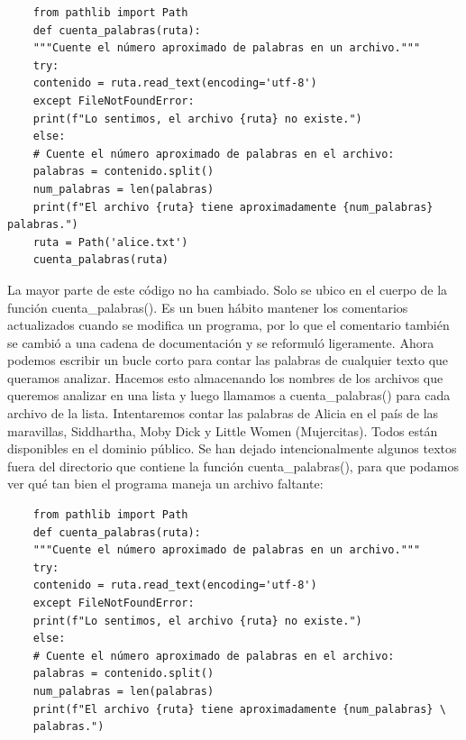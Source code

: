 \vspace{-0.2cm}
\hspace{-2.5cm}{\ttfamily \scriptsize palabras.py}\vspace{-0.84cm} 
\begin{lstlisting}
	from pathlib import Path
	def cuenta_palabras(ruta):
	"""Cuente el número aproximado de palabras en un archivo."""
	try:
	contenido = ruta.read_text(encoding='utf-8')
	except FileNotFoundError:
	print(f"Lo sentimos, el archivo {ruta} no existe.")
	else:
	# Cuente el número aproximado de palabras en el archivo:
	palabras = contenido.split()
	num_palabras = len(palabras)
	print(f"El archivo {ruta} tiene aproximadamente {num_palabras} palabras.")
	ruta = Path('alice.txt')
	cuenta_palabras(ruta)
\end{lstlisting}

La mayor parte de este código no ha cambiado. Solo se ubico en el cuerpo de la función {\ttfamily cuenta\_palabras()}. Es un buen hábito mantener los comentarios actualizados cuando se modifica un programa, por lo que el comentario también se cambió a una cadena de documentación y se reformuló ligeramente.
Ahora podemos escribir un bucle corto para contar las palabras de cualquier texto que queramos analizar. 
Hacemos esto almacenando los nombres de los archivos que queremos analizar en una lista y luego llamamos a {\ttfamily cuenta\_palabras()} para cada archivo de la lista. Intentaremos contar las palabras de Alicia en el país de las maravillas, Siddhartha, Moby Dick y Little Women (Mujercitas). Todos  están disponibles en el dominio público. Se han dejado intencionalmente algunos textos fuera del directorio 
que contiene la función {\ttfamily cuenta\_palabras()}, para que podamos ver qué tan bien el programa maneja un archivo faltante:

\hspace{-2.3cm}{\ttfamily \scriptsize cuenta\_}

\vspace{-0.2cm}
\hspace{-2.5cm}{\ttfamily \scriptsize palabras.py}\vspace{-0.84cm} 
\begin{lstlisting}
	from pathlib import Path
	def cuenta_palabras(ruta):
	"""Cuente el número aproximado de palabras en un archivo."""
	try:
	contenido = ruta.read_text(encoding='utf-8')
	except FileNotFoundError:
	print(f"Lo sentimos, el archivo {ruta} no existe.")
	else:
	# Cuente el número aproximado de palabras en el archivo:
	palabras = contenido.split()
	num_palabras = len(palabras)
	print(f"El archivo {ruta} tiene aproximadamente {num_palabras} \
	palabras.")
\end{lstlisting}

